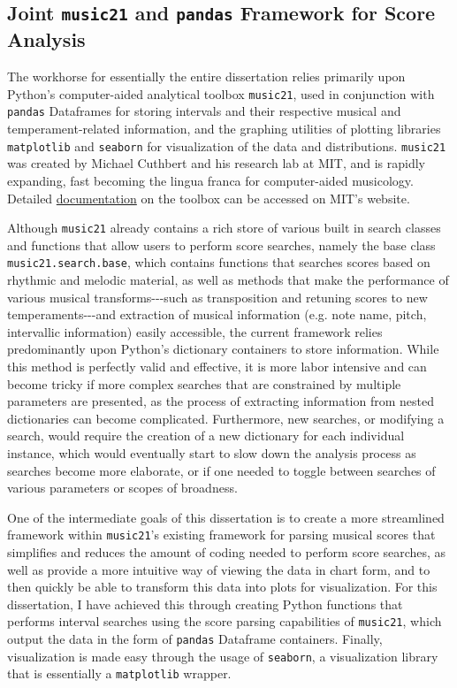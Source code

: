     \subsection{\texorpdfstring{Joint \texttt{music21} and \texttt{pandas}
Framework for Score
Analysis}{Joint music21 and pandas Framework for Score Analysis}}\label{joint-music21-and-pandas-framework-for-score-analysis}

The workhorse for essentially the entire dissertation relies primarily
upon Python's computer-aided analytical toolbox \texttt{music21}, used
in conjunction with \texttt{pandas} Dataframes for storing intervals and
their respective musical and temperament-related information, and the
graphing utilities of plotting libraries \texttt{matplotlib} and
\texttt{seaborn} for visualization of the data and distributions.
\texttt{music21} was created by Michael Cuthbert and his research lab at
MIT, and is rapidly expanding, fast becoming the lingua franca for
computer-aided musicology. Detailed
\href{https://web.mit.edu/music21/}{documentation} on the toolbox can be
accessed on MIT's website.

Although \texttt{music21} already contains a rich store of various built
in search classes and functions that allow users to perform score
searches, namely the base class \texttt{music21.search.base}, which
contains functions that searches scores based on rhythmic and melodic
material, as well as methods that make the performance of various
musical transforms-\/-\/-such as transposition and retuning scores to
new temperaments-\/-\/-and extraction of musical information (e.g. note
name, pitch, intervallic information) easily accessible, the current
framework relies predominantly upon Python's dictionary containers to
store information. While this method is perfectly valid and effective,
it is more labor intensive and can become tricky if more complex
searches that are constrained by multiple parameters are presented, as
the process of extracting information from nested dictionaries can
become complicated. Furthermore, new searches, or modifying a search,
would require the creation of a new dictionary for each individual
instance, which would eventually start to slow down the analysis process
as searches become more elaborate, or if one needed to toggle between
searches of various parameters or scopes of broadness.

One of the intermediate goals of this dissertation is to create a more
streamlined framework within \texttt{music21}'s existing framework for
parsing musical scores that simplifies and reduces the amount of coding
needed to perform score searches, as well as provide a more intuitive
way of viewing the data in chart form, and to then quickly be able to
transform this data into plots for visualization. For this dissertation,
I have achieved this through creating Python functions that performs
interval searches using the score parsing capabilities of
\texttt{music21}, which output the data in the form of \texttt{pandas}
Dataframe containers. Finally, visualization is made easy through the
usage of \texttt{seaborn}, a visualization library that is essentially a
\texttt{matplotlib} wrapper.

